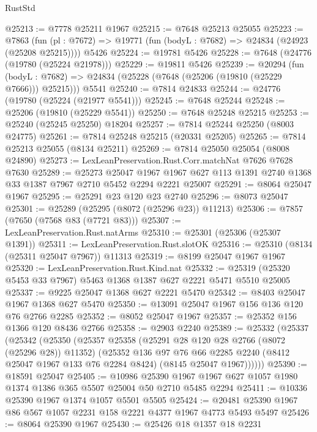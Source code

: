 \begin{lexlean}{RustStd}
\begin{coremodule}
{\begin{coremodule}
{{{{{{{{{{{{{{{{{{{{{{{{{{{{{{{{{{{{{{{{{{{{{{{{{{{{{@25213 := @7778 @25211 @1967
@25215 := @7648 @25213 @25055
@25223 := @7863
    (fun (pl : @7672) => @19771 (fun (bodyL : @7682) => @24834 (@24923 (@25208 @25215))))
    @5426
@25224 := @19781 @5426
@25228 := @7648 (@24776 (@19780 (@25224 @21978)))
@25229 := @19811 @5426
@25239 := @20294
    (fun (bodyL : @7682) => @24834 (@25228 (@7648 (@25206 (@19810 (@25229 @7666))) @25215)))
    @5541
@25240 := @7814 @24833
@25244 := @24776 (@19780 (@25224 (@21977 @5541)))
@25245 := @7648 @25244
@25248 := @25206 (@19810 (@25229 @5541))
@25250 := @7648 @25248 @25215
@25253 := @25240 (@25245 @25250) @18204
@25257 := @7814 @25244 @25250 (@8003 @24775)
@25261 := @7814 @25248 @25215 (@20331 @25205)
@25265 := @7814 @25213 @25055 (@8134 @25211)
@25269 := @7814 @25050 @25054 (@8008 @24890)
@25273 := LexLeanPreservation.Rust.Corr.matchNat @7626 @7628 @7630
@25289 := @25273
    @25047
    @1967
    @1967
    @627
    @113
    @1391
    @2740
    @1368
    @33
    @1387
    @7967
    @2710
    @5452
    @2294
    @2221
    @25007
@25291 := @8064 @25047 @1967
@25295 := @25291 @23 @120 @23 @2740
@25296 := @8073 @25047
@25301 := @25289 (@25295 (@8072 (@25296 @23)) @11213)
@25306 := @7857 (@7650 (@7568 @83 (@7721 @83)))
@25307 := LexLeanPreservation.Rust.natArms
@25310 := @25301 (@25306 (@25307 @1391))
@25311 := LexLeanPreservation.Rust.slotOK
@25316 := @25310 (@8134 (@25311 @25047 @7967)) @11313
@25319 := @8199 @25047 @1967 @1967
@25320 := LexLeanPreservation.Rust.Kind.nat
@25332 := @25319 (@25320 @5453 @33 @7967) @5463 @1368 @1387 @627 @2221 @5471 @5510 @25005
@25337 := @9225 @25047 @1368 @627 @2221 @5470
@25342 := @8403 @25047 @1967 @1368 @627 @5470
@25350 := @13091 @25047 @1967 @156 @136 @120 @76 @2766 @2285
@25352 := @8052 @25047 @1967
@25357 := @25352 @156 @1366 @120 @8436 @2766
@25358 := @2903 @2240
@25389 := @25332
    (@25337
      (@25342
        (@25350
          (@25357
            @25358
            (@25291 @28 @120 @28 @2766 (@8072 (@25296 @28)) @11352)
            (@25352
              @136
              @97
              @76
              @66
              @2285
              @2240
              (@8412 @25047 @1967 @133 @76 @2284 @8424)
              (@8145 @25047 @1967))))))
@25390 := @18591 @25047
@25405 := @10986
    @25390
    @1967
    @1967
    @627
    @1057
    @1980
    @1374
    @1386
    @365
    @5507
    @25004
    @50
    @2710
    @5485
    @2294
@25411 := @10336 @25390 @1967 @1374 @1057 @5501 @5505
@25424 := @20481 @25390 @1967 @86 @567 @1057 @2231 @158 @2221 @4377 @1967 @4773 @5493 @5497
@25426 := @8064 @25390 @1967
@25430 := @25426 @18 @1357 @18 @2231
}}}}}}}}}}}}}}}}}}}}}}}}}}}}}}}}}}}}}}}}}}}}}}}}}}}}}
\end{coremodule}}
\end{coremodule}
\end{lexlean}
